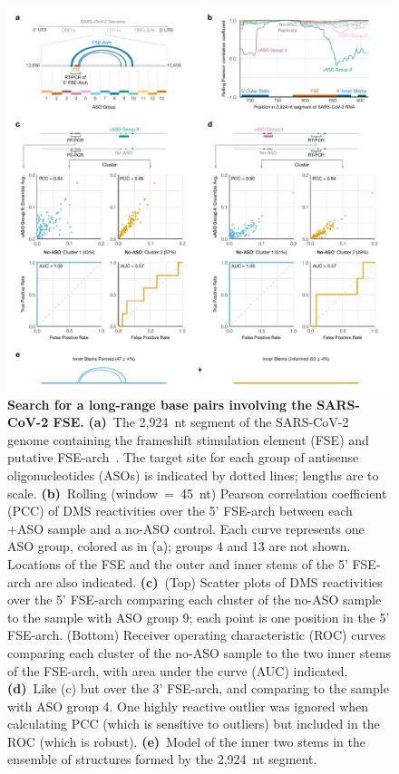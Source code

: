 \documentclass[main.tex]{subfiles}
\begin{document}
\begin{figure}[H]
	\includegraphics[width=\textwidth]{../MainFigures/sars2-tile/sars2-tile.pdf}
	\caption{\textbf{Search for a long-range base pairs involving the SARS-CoV-2 FSE.} \textbf{(a)}~The 2,924~nt segment of the SARS-CoV-2 genome containing the frameshift stimulation element (FSE) and putative FSE-arch~\cite{Ziv2020}. The target site for each group of antisense oligonucleotides (ASOs) is indicated by dotted lines; lengths are to scale. \textbf{(b)}~Rolling (window~=~45~nt) Pearson correlation coefficient (PCC) of DMS reactivities over the 5' FSE-arch between each +ASO sample and a no-ASO control. Each curve represents one ASO group, colored as in (a); groups 4 and 13 are not shown. Locations of the FSE and the outer and inner stems of the 5' FSE-arch are also indicated. \textbf{(c)}~(Top) Scatter plots of DMS reactivities over the 5' FSE-arch comparing each cluster of the no-ASO sample to the sample with ASO group 9; each point is one position in the 5' FSE-arch. (Bottom) Receiver operating characteristic (ROC) curves comparing each cluster of the no-ASO sample to the two inner stems of the FSE-arch, with area under the curve (AUC) indicated. \textbf{(d)}~Like (c) but over the 3' FSE-arch, and comparing to the sample with ASO group 4. One highly reactive outlier was ignored when calculating PCC (which is sensitive to outliers) but included in the ROC (which is robust). \textbf{(e)}~Model of the inner two stems in the ensemble of structures formed by the 2,924~nt segment.}
	\label{tiles}
\end{figure}
\end{document}
